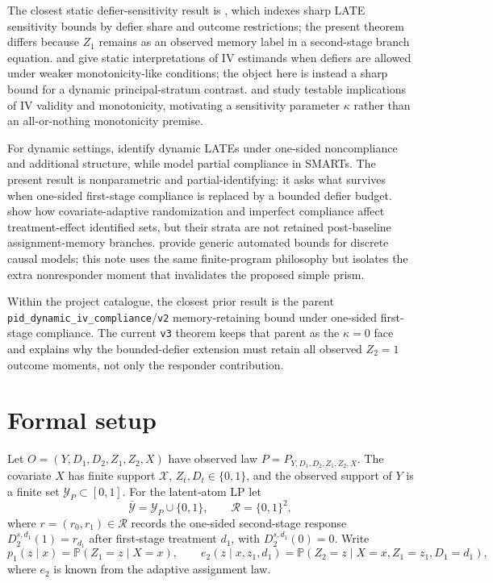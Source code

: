 \documentclass[11pt]{article}
\renewcommand{\Pr}{\mathbb{P}}
\theoremstyle{definition}
\theoremstyle{plain}
\theoremstyle{remark}
\begin{document}
The closest static defier-sensitivity result is \cite{Noack2021}, which indexes sharp LATE sensitivity bounds by defier share and outcome restrictions; the present theorem differs because \(Z_1\) remains as an observed memory label in a second-stage branch equation.
\cite{DeChaisemartin2017} and \cite{DahlHuberMellace2023} give static interpretations of IV estimands when defiers are allowed under weaker monotonicity-like conditions; the object here is instead a sharp bound for a dynamic principal-stratum contrast.
\cite{Kitagawa2015} and \cite{MourifieWan2017} study testable implications of IV validity and monotonicity, motivating a sensitivity parameter \(\kappa\) rather than an all-or-nothing monotonicity premise.

For dynamic settings, \cite{SojitraSyrgkanis2024} identify dynamic LATEs under one-sided noncompliance and additional structure, while \cite{ArtmanBhattacharyaErtefaieLynchMcKayJohnson2024} model partial compliance in SMARTs.
The present result is nonparametric and partial-identifying: it asks what survives when one-sided first-stage compliance is replaced by a bounded defier budget.
\cite{BugniGaoObradovicVelez2024} show how covariate-adaptive randomization and imperfect compliance affect treatment-effect identified sets, but their strata are not retained post-baseline assignment-memory branches.
\cite{DuarteFinkelsteinKnoxMummoloShpitser2024} provide generic automated bounds for discrete causal models; this note uses the same finite-program philosophy but isolates the extra nonresponder moment that invalidates the proposed simple prism.

Within the project catalogue, the closest prior result is the parent \texttt{pid\_dynamic\_iv\_compliance}/\texttt{v2} memory-retaining bound under one-sided first-stage compliance.
The current \texttt{v3} theorem keeps that parent as the \(\kappa=0\) face and explains why the bounded-defier extension must retain all observed \(Z_2=1\) outcome moments, not only the responder contribution.

\section{Formal setup}
Let \(O=(Y,D_1,D_2,Z_1,Z_2,X)\) have observed law \(P=P_{Y,D_1,D_2,Z_1,Z_2,X}\).
The covariate \(X\) has finite support \(\mathcal X\), \(Z_t,D_t\in\{0,1\}\), and the observed support of \(Y\) is a finite set \(\mathcal Y_P\subset[0,1]\).
For the latent-atom LP let
\[
\bar{\mathcal Y}=\mathcal Y_P\cup\{0,1\},\qquad
\mathcal R=\{0,1\}^2,
\]
where \(r=(r_0,r_1)\in\mathcal R\) records the one-sided second-stage response \(D_2^{s,d_1}(1)=r_{d_1}\) after first-stage treatment \(d_1\), with \(D_2^{s,d_1}(0)=0\).
Write
\[
p_1(z\mid x)=\Pr(Z_1=z\mid X=x),\qquad
e_2(z\mid x,z_1,d_1)=\Pr(Z_2=z\mid X=x,Z_1=z_1,D_1=d_1),
\]
where \(e_2\) is known from the adaptive assignment law.
\end{document}
